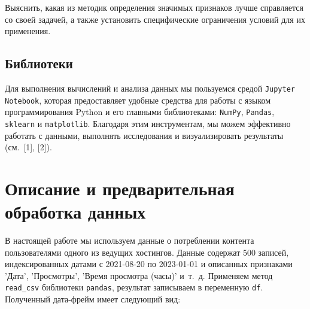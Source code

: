 \documentclass[a4paper,12pt]{article}
\begin{document}
Выяснить, какая из методик определения значимых признаков лучше справляется со своей задачей, а также  установить специфические ограничения условий для их применения.

\subsection{Библиотеки}
Для выполнения вычислений и анализа данных мы пользуемся средой \texttt{Jupyter Notebook}, которая предоставляет удобные средства для работы с языком программирования Python и его главными библиотеками: \texttt{NumPy}, \texttt{Pandas}, \texttt{sklearn} и \texttt{matplotlib}. Благодаря этим инструментам, мы можем эффективно работать с данными, выполнять исследования и визуализировать результаты (см. [1], [2]). 

%

\section{Описание и предварительная\\ обработка данных}


В настоящей работе мы используем данные о потреблении контента пользователями одного из ведущих хостингов. Данные содержат 500 записей, индексированных датами с 2021-08-20 по 2023-01-01 и описанных признаками 'Дата', 'Просмотры', 'Время просмотра (часы)' и т. д.  Применяем метод \texttt{read\_csv} библиотеки \texttt{pandas}, результат записываем в переменную \texttt{df}. Полученный дата-фрейм имеет следующий вид:
\end{document}
